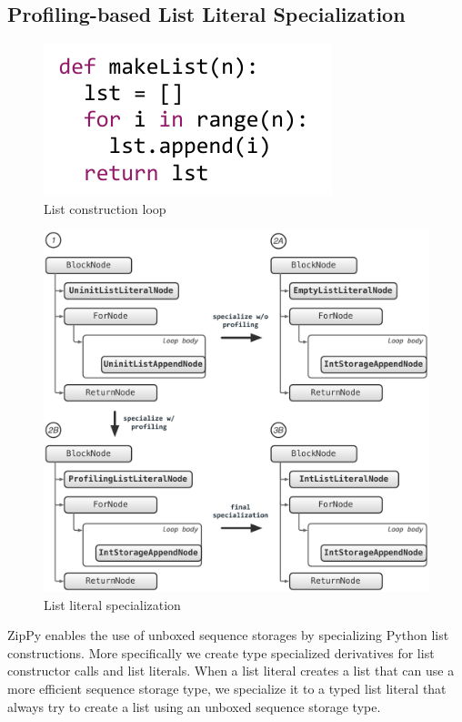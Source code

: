 \subsection{Profiling-based List Literal Specialization}

\begin{figure}[ht]
\centering
\includegraphics[scale=.9]{figures/ch3-list-construction-loop-code.pdf}
\caption{List construction loop}
\label{fig:list-construction-loop-code}
\end{figure}

\begin{figure}[t]
\centering
\includegraphics[scale=.55]{figures/ch3-empty-list-storage-profiling.pdf}
\caption{List literal specialization}
\label{fig:empty-list-storage-profiling}
\end{figure}

ZipPy enables the use of unboxed sequence storages by specializing Python list constructions.
More specifically we create type specialized derivatives for list constructor calls and list literals.
When a list literal creates a list that can use a more efficient sequence storage type, we specialize it to a typed list literal
that always try to create a list using an unboxed sequence storage type.

